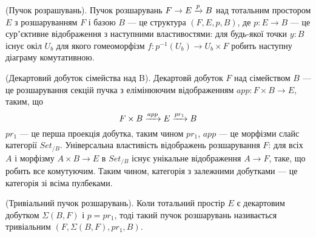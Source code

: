 \begin{definition} (Пучок розрашувань).
Пучок розшарувань $ F \rightarrow E \xrightarrow{{p}} B$ над тотальним простором $E$ з розшаруванням $F$ і базою $B$ — це
структура $(F,E,p,B)$, де $p: E \rightarrow B$ — це сурʼєктивне відображення з наступними властивостями:
для будь-якої точки $y: B$ існує окіл $U_b$ для якого гомеоморфізм $f: p^{-1}(U_b) \rightarrow U_b \times F$
робить наступну діаграму комутативною.
\begin{center}
\end{center}
\end{definition}

\begin{definition} (Декартовий добуток сімейства над B).
Декартовй добуток $F$ над сімейством $B$ — це розшарування секцій пучка з елімінюючим відображенням $app : F \times B \rightarrow E$, таким, що
\begin{equation}
F \times B \xrightarrow{{app}} E \xrightarrow{{pr_1}} B
\end{equation}
$pr_1$ — це перша проекція добутка, таким чином $pr_1$, $app$ — це морфізми
слайс категорії $Set_{/B}$. Універсальна властивість відображень розшарування $F$:
для всіх $A$ і морфізму $A \times B \rightarrow E$ в $Set_{/B}$ існує
унікальне відображення $A \rightarrow F$, таке, що робить все комутуючим.
Таким чином, категорія з залежними добутками — це категорія зі всіма пулбеками.
\end{definition}

\begin{definition} (Тривіальний пучок розшарувань).
Коли тотальний простір $E$ є декартовим добутком $\Sigma(B,F)$ і $p = pr_1$,
тоді такий пучок розшарувань називається тривіальним $(F,\Sigma(B,F),pr_1,B)$.
\end{definition}


